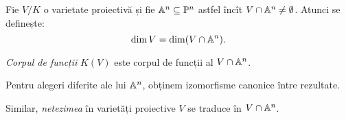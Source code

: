 \begin{definition}\label{def:corp-functii}
  Fie $ V/K $ o varietate proiectivă și fie $ \mathbb{A}^n \subseteq \mathbb{P}^n $ astfel încît
  $ V \cap \mathbb{A}^n \neq \emptyset $. Atunci se definește:
  \[
    \dim V = \dim (V \cap \mathbb{A}^n).
  \]

  \emph{Corpul de funcții} $ K(V) $ este corpul de funcții al $ V \cap \mathbb{A}^n $.
\end{definition}

\begin{remark}\label{rk:alegeri}
  Pentru alegeri diferite ale lui $ \mathbb{A}^n $, obținem izomorfisme canonice între
  rezultate.
\end{remark}

Similar, \emph{netezimea} în varietăți proiective $ V $ se traduce în $ V \cap \mathbb{A}^n $.

